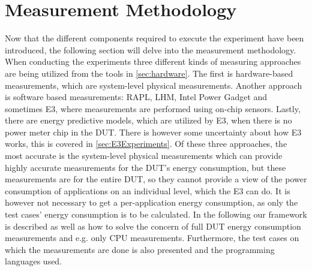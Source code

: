 \section{Measurement Methodology}\label{sec:Measurement_Methodology}

Now that the different components required to execute the experiment have been introduced, the following section will delve into the measurement methodology. When conducting the experiments three different kinds of measuring approaches are being utilized from the tools in \cref{sec:hardware}.
The first is hardware-based measurements, which are system-level physical measurements. Another approach is software based measurements: RAPL, LHM, Intel Power Gadget and sometimes E3, where measurements are performed using on-chip sensors. Lastly, there are energy predictive models, which are utilized by E3, when there is no power meter chip in the DUT. There is however some uncertainty about how E3 works, this is covered in \cref{sec:E3Experiments}. Of these three approaches, the most accurate is the system-level physical measurements which can provide highly accurate measurements for the DUT's energy consumption, but these measurements are for the entire DUT, so they cannot provide a view of the power consumption of applications on an individual level, which the E3 can do. It is however not necessary to get a per-application energy consumption, as only the test cases' energy consumption is to be calculated. In the following our framework is described as well as how to solve the concern of full DUT energy consumption measurements and e.g. only CPU measurements. Furthermore, the test cases on which the measurements are done is also presented and the programming languages used.





%


